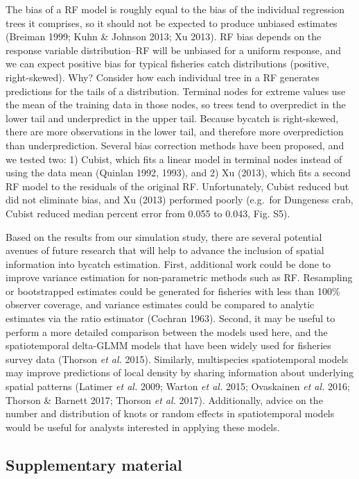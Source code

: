 \documentclass[]{article}
\begin{document}
The bias of a RF model is roughly equal to the bias of the individual
regression trees it comprises, so it should not be expected to produce
unbiased estimates (Breiman 1999; Kuhn \& Johnson 2013; Xu 2013). RF
bias depends on the response variable distribution--RF will be unbiased
for a uniform response, and we can expect positive bias for typical
fisheries catch distributions (positive, right-skewed). Why? Consider
how each individual tree in a RF generates predictions for the tails of
a distribution. Terminal nodes for extreme values use the mean of the
training data in those nodes, so trees tend to overpredict in the lower
tail and underpredict in the upper tail. Because bycatch is
right-skewed, there are more observations in the lower tail, and
therefore more overprediction than underprediction. Several bias
correction methods have been proposed, and we tested two: 1) Cubist,
which fits a linear model in terminal nodes instead of using the data
mean (Quinlan 1992, 1993), and 2) Xu (2013), which fits a second RF
model to the residuals of the original RF. Unfortunately, Cubist reduced
but did not eliminate bias, and Xu (2013) performed poorly (e.g.~for
Dungeness crab, Cubist reduced median percent error from 0.055 to 0.043,
Fig. S5).

Based on the results from our simulation study, there are several
potential avenues of future research that will help to advance the
inclusion of spatial information into bycatch estimation. First,
additional work could be done to improve variance estimation for
non-parametric methods such as RF. Resampling or bootstrapped estimates
could be generated for fisheries with less than 100\% observer coverage,
and variance estimates could be compared to analytic estimates via the
ratio estimator (Cochran 1963). Second, it may be useful to perform a
more detailed comparison between the models used here, and the
spatiotemporal delta-GLMM models that have been widely used for
fisheries survey data (Thorson \emph{et al.} 2015). Similarly,
multispecies spatiotemporal models may improve predictions of local
density by sharing information about underlying spatial patterns
(Latimer \emph{et al.} 2009; Warton \emph{et al.} 2015; Ovaskainen
\emph{et al.} 2016; Thorson \& Barnett 2017; Thorson \emph{et al.}
2017). Additionally, advice on the number and distribution of knots or
random effects in spatiotemporal models would be useful for analysts
interested in applying these models.

\hypertarget{supplementary-material}{%
\subsection{Supplementary material}\label{supplementary-material}}
\end{document}
